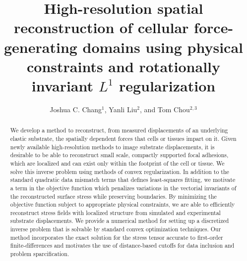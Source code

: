 \documentclass[aps,prl,reprint,twocolumn,groupedaddress,showpacs]{revtex4}
\begin{document}
\title{High-resolution spatial reconstruction of cellular
  force-generating domains using physical constraints and rotationally invariant $L^{1}$
  regularization}

\author{Joshua C. Chang$^{1}$, Yanli Liu$^{2}$, and Tom Chou$^{2,3}$}
 





\begin{abstract}
We develop a method to reconstruct, from measured displacements of an
underlying elastic substrate, the spatially dependent forces that
cells or tissues impart on it.  Given newly available high-resolution
methods to image substrate displacements, it is desirable to be able
to reconstruct small scale, compactly supported focal adhesions, which
are localized and can exist only within the footprint of the cell or
tissue.  We solve this inverse problem using methods of convex
regularization. In addition to the standard quadratic data mismatch
terms that defines least-squares fitting, we motivate a term in the
objective function which penalizes variations in the vectorial invariants
of the reconstructed surface stress while preserving boundaries.  By
minimizing the objective function subject to appropriate physical
constraints, we are able to efficiently reconstruct stress fields with
localized structure from simulated and experimental substrate
displacements. We provide a numerical method for setting up a
discretized inverse problem that is solvable by standard convex
optimization techniques. Our method incorporates the exact solution
for the stress tensor accurate to first-order finite-differences and
motivates the use of distance-based cutoffs for data inclusion and problem 
sparcification.
\end{abstract}
\maketitle
\end{document}
